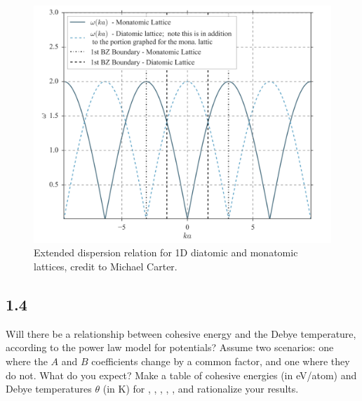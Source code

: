 \documentclass[12pt]{article}
\begin{document}
\begin{figure}[h]
	\centering
	\includegraphics[width=0.8\linewidth]{images/1_3.png}
	\caption{Extended dispersion relation for 1D diatomic and monatomic lattices, credit to Michael Carter.}
	\label{fig:monatomic}
\end{figure}

\subsection{1.4}
Will there be a relationship between cohesive energy and the Debye temperature,
according to the power law model for potentials?
Assume two scenarios: one where the $A$ and $B$ coefficients change by a
common factor, and one where they do not. What do you expect? Make a
table of cohesive energies (in \si{\electronvolt}/atom) and Debye temperatures $\theta$ (in
\si{\kelvin}) for , , , , ,  and rationalize your results.
\end{document}
